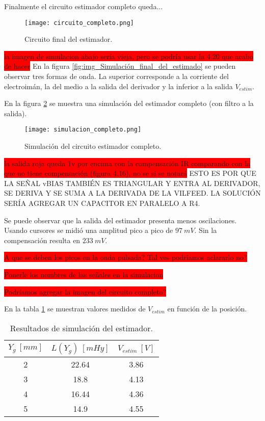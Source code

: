 Finalmente el circuito estimador completo queda...

\begin{figure}[H]
\centering
\texttt{[image: circuito\_completo.png]}
\caption{Circuito final del estimador.}
\label{fig:img_circuito_final_del_estimador}
\end{figure}


\colorbox{red}{la imagen de simulacion abajo sería vieja, pero se podría usar la 4.20 que acabo de hacer}
En la figura \ref{fig:img_Simulación_final_del_estimado} se pueden observar tres formas de onda. La superior corresponde a la corriente del electroimán, la del medio a la salida del derivador y la inferior a la salida $V_{estim}$.

En la figura \ref{fig:img_simulacion_completo} se muestra una simulación del estimador completo (con filtro a la salida).

\begin{figure}[H]
	\centering
	\texttt{[image: simulacion\_completo.png]}
	\caption{Simulación del circuito estimador completo.}
	\label{fig:img_simulacion_completo}
\end{figure}
\colorbox{red}{la salida roja queda 1v por encima con la compensación IR comparando con la que no tiene compensación (figura 4.16), no se si se notará}
ESTO ES POR QUE LA SEÑAL vBIAS TAMBIÉN ES TRIANGULAR Y ENTRA AL DERIVADOR, SE DERIVA Y SE SUMA A LA DERIVADA DE LA VILFEED. LA SOLUCIÓN SERÍA AGREGAR UN CAPACITOR EN PARALELO A R4.

Se puede observar que la salida del estimador presenta menos oscilaciones. Usando cursores se midió una amplitud pico a pico de $97\:mV$. Sin la compensación resulta en $233\:mV$.

\colorbox{red}{A que se deben los picos en la onda pulsada? Tal ves podríamos aclararlo no?}


\colorbox{red}{Ponerle los nombres de las señales en la simulacion}


\colorbox{red}{Podríamos agregar la imagen del circuito completo?}



En la tabla \ref{tab_Resultados_de_simulación_del_estimador} se muestran valores medidos de $V_{estim}$ en función de la posición.


\begin{table}[H]
	\begin{center}
		\begin{tabular}{| c | c | c |}
			\hline
			$Y_g\:[mm]$ & $L(Y_g)\:[mHy]$ & $V_{estim}\:[V]$ \\ \hline 
			2 & 22.64 & 3.86 \\ \hline 
			3 & 18.8 & 4.13 \\ \hline 
			4 & 16.44 & 4.36 \\ \hline 
			5 & 14.9 & 4.55 \\ \hline 
		\end{tabular}
		\caption{Resultados de simulación del estimador.}
		\label{tab_Resultados_de_simulación_del_estimador}
	\end{center}
\end{table}


